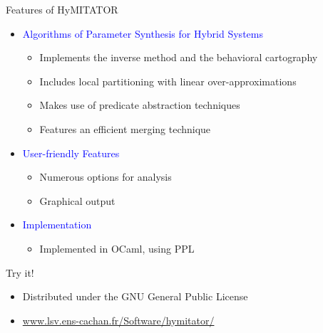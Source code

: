 \documentclass[final]{beamer}
\newcommand{\refer}[1]{\textcolor{blue}{\cite{#1}}}
\newcommand{\coulitem}[1]{\textcolor{blue}{#1}}
\newcommand{\hymitator}{HyMITATOR} %
\begin{document}
\begin{frame}{}
\begin{columns}[t]
\begin{column}{.45\linewidth}
\begin{block}{Features of \hymitator{}}
\begin{itemize}
	\item \coulitem{Algorithms of Parameter Synthesis for Hybrid Systems}
	\begin{itemize}
		\item Implements the inverse method and the behavioral cartography
		\item Includes local partitioning with linear over-approximations
		\item Makes use of predicate abstraction techniques
		\item Features an efficient merging technique~\refer{afs12}
	\end{itemize}
	
	\vspace{0.5cm}

% 

	\item \coulitem{User-friendly Features}
	\begin{itemize}
		\item Numerous options for analysis
		\item Graphical output
	\end{itemize}

	\item \coulitem{Implementation}  \refer{AK12}
	\begin{itemize}
		\item Implemented in OCaml, using PPL~\refer{bhz08}
	\end{itemize}
\end{itemize}

\end{block}    




\begin{block}{Try it!}

\begin{itemize}
	\item Distributed under the GNU General Public License
	\item \url{www.lsv.ens-cachan.fr/Software/hymitator/}
\end{itemize}


\end{block}
\end{column}
\end{columns}
\end{frame}
\end{document}
